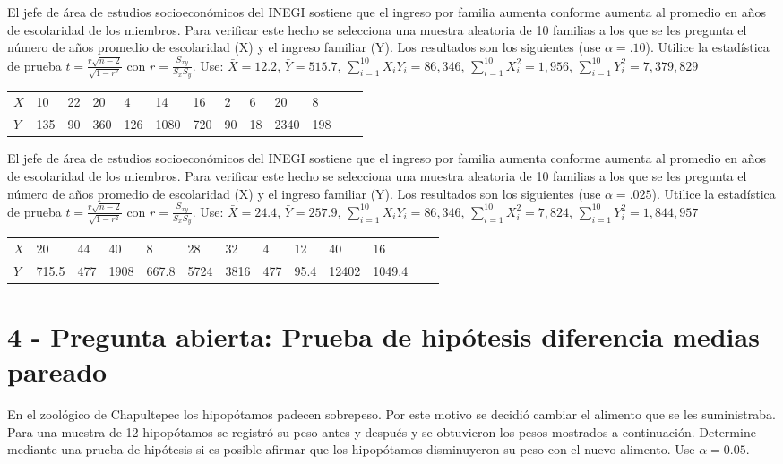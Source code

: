 \documentclass[addpoints]{exam}
\theoremstyle{mytheor}
\begin{document}
\begin{questions}
  
  \question El jefe de área de estudios socioeconómicos del INEGI sostiene que el ingreso por familia aumenta conforme aumenta al promedio en años de escolaridad de los miembros. Para verificar este hecho se selecciona una muestra aleatoria de 10 familias a los que se les pregunta el número de años promedio de escolaridad (X) y el ingreso familiar (Y). Los resultados son los siguientes {(use $\alpha = .10$)}. Utilice la estadística de prueba $t = \frac{r \sqrt{n-2}}{\sqrt{1-r^2}}$ con $r = \frac{S_{xy}}{S_x S_y}$. Use: $\bar{X} =  12.2$,  $\bar{Y} =  515.7$, $\sum_{i=1}
  ^{10}{X_i Y_i} = 86,346$, $\sum_{i=1}^{10}{X_i^2} =  1,956$, $\sum_{i=1}^{10}{Y_i^2} =   7,379,829$ 
    
    \begin{table}[h]
  \centering
  \begin{tabular}{lllllllllllll} 
  $X$ & 10 & 22 & 20 & 4 & 14 & 16 & 2 & 6 & 20 & 8 \\
  $Y$ & 135 & 90 & 360 & 126 & 1080 & 720 & 90 & 18 & 2340 & 198
  \end{tabular}
  \end{table}
  
  
  \question El jefe de área de estudios socioeconómicos del INEGI sostiene que el ingreso por familia aumenta conforme aumenta al promedio en años de escolaridad de los miembros. Para verificar este hecho se selecciona una muestra aleatoria de 10 familias a los que se les pregunta el número de años promedio de escolaridad (X) y el ingreso familiar (Y). Los resultados son los siguientes {(use $\alpha = .025$)}. Utilice la estadística de prueba $t = \frac{r \sqrt{n-2}}{\sqrt{1-r^2}}$ con $r = \frac{S_{xy}}{S_x S_y}$. Use: $\bar{X} =  24.4$,  $\bar{Y} =  257.9$, $\sum_{i=1}
  ^{10}{X_i Y_i} = 86,346$, $\sum_{i=1}^{10}{X_i^2} =  7,824$, $\sum_{i=1}^{10}{Y_i^2} =   1,844,957$ 
    \begin{table}[h]
  \centering
  \begin{tabular}{lllllllllllll} 
  $X$ & 20 & 44 & 40 & 8 & 28 & 32 & 4 & 12 & 40 & 16 \\
  $Y$ & 715.5 & 477 & 1908 & 667.8 & 5724 & 3816 & 477 & 95.4 & 12402 & 1049.4
  \end{tabular}
  \end{table}
  
  
  \newpage
  
  \section*{4 - Pregunta abierta: Prueba de hipótesis diferencia medias pareado}
  \question En el zoológico de Chapultepec los hipopótamos padecen sobrepeso. Por este motivo se decidió cambiar el alimento que se les suministraba. Para una muestra de 12 hipopótamos se registró su peso antes y después y se obtuvieron los pesos mostrados a continuación. Determine mediante una prueba de hipótesis si es posible afirmar que los hipopótamos disminuyeron su peso con el nuevo alimento. Use $\alpha = 0.05$. 
  

\end{questions}
\end{document}
